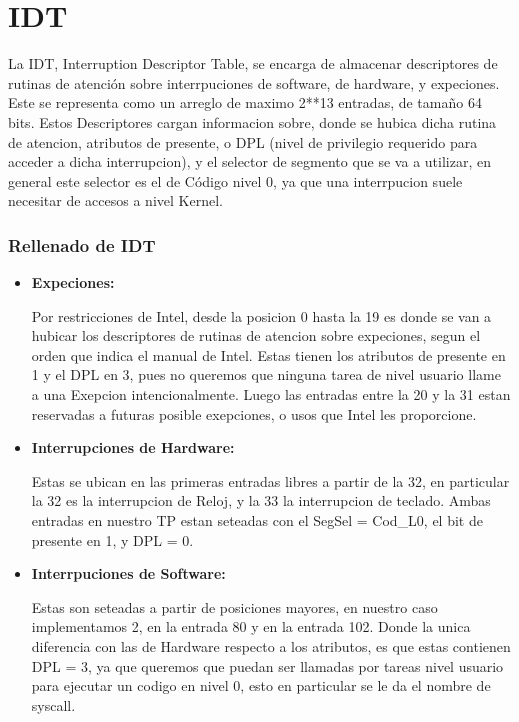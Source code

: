 \section{IDT}
\label{subsec:IDT}
\par{La IDT, Interruption Descriptor Table, se encarga de almacenar descriptores de rutinas de atención sobre interrpuciones de software, de hardware, y expeciones. Este se representa como un arreglo de maximo 2**13 entradas, de tamaño 64 bits. Estos Descriptores cargan informacion sobre, donde se hubica dicha rutina de atencion, atributos de presente, o DPL (nivel de privilegio requerido para acceder a dicha interrupcion), y el selector de segmento que se va a utilizar, en general este selector es el de Código nivel 0, ya que una interrpucion suele necesitar de accesos a nivel Kernel.}

\subsubsection*{Rellenado de IDT}
\begin{itemize}
	\item {\bfseries Expeciones: }
	\par{Por restricciones de Intel, desde la posicion 0 hasta la 19 es donde se van a hubicar los descriptores de rutinas de atencion sobre expeciones, segun el orden que indica el manual de Intel. Estas tienen los atributos de presente en 1 y el DPL en 3, pues no queremos que ninguna tarea de nivel usuario llame a una Exepcion intencionalmente. Luego las entradas entre la 20 y la 31 estan reservadas a futuras posible exepciones, o usos que Intel les proporcione.}
	
	\item {\bfseries Interrupciones de Hardware: }
	\par{ Estas se ubican en las primeras entradas libres a partir de la 32, en particular la 32 es la interrupcion de Reloj, y la 33 la interrupcion de teclado. Ambas entradas en nuestro TP estan seteadas con el SegSel = Cod\_L0, el bit de presente en 1, y DPL = 0.}
	
	\item {\bfseries Interrpuciones de Software: }
	\par{Estas son seteadas a partir de posiciones mayores, en nuestro caso implementamos 2, en la entrada 80 y en la entrada 102. Donde la unica diferencia con las de Hardware respecto a los atributos, es que estas contienen DPL = 3, ya que queremos que puedan ser llamadas por tareas nivel usuario para ejecutar un codigo en nivel 0, esto en particular se le da el nombre de syscall.}

\end{itemize}

